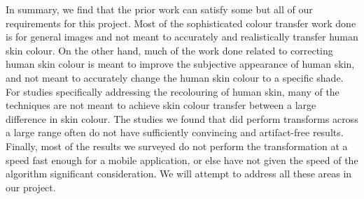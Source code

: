 In summary, we find that the prior work can satisfy some but all of our requirements for this project. Most of the sophisticated colour transfer work done is for general images and not meant to accurately and realistically transfer human skin colour. On the other hand, much of the work done related to correcting human skin colour is meant to improve the subjective appearance of human skin, and not meant to accurately change the human skin colour to a specific shade. For studies specifically addressing the recolouring of human skin, many of the techniques are not meant to achieve skin colour transfer between a large difference in skin colour. The studies we found that did perform transforms across a large range often do not have sufficiently convincing and artifact-free results. Finally, most of the results we surveyed do not perform the transformation at a speed fast enough for a mobile application, or else have not given the speed of the algorithm significant consideration. We will attempt to address all these areas in our project.
